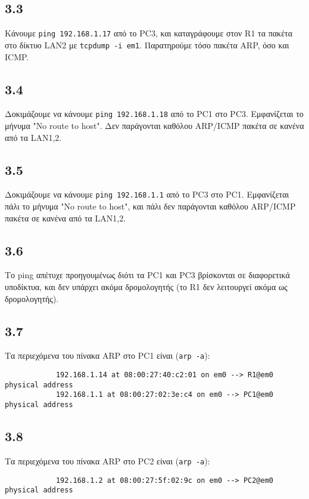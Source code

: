 \documentclass[a4paper, 12pt]{article}
\begin{document}
	\subsection*{3.3}
		Κάνουμε \verb|ping 192.168.1.17| από το PC3, και καταγράφουμε στον R1 τα πακέτα στο δίκτυο LAN2 με \verb|tcpdump -i em1|. Παρατηρούμε τόσο πακέτα ARP, όσο και ICMP.

	\subsection*{3.4}
		Δοκιμάζουμε να κάνουμε \verb|ping 192.168.1.18| από το PC1 στο PC3. Εμφανίζεται το μήνυμα "No route to host". Δεν παράγονται καθόλου ARP/ICMP πακέτα σε κανένα από τα LAN1,2.

	\subsection*{3.5}
		Δοκιμάζουμε να κάνουμε \verb|ping 192.168.1.1| από το PC3 στο PC1. Εμφανίζεται πάλι το μήνυμα "No route to host", και πάλι δεν παράγονται καθόλου ARP/ICMP πακέτα σε κανένα από τα LAN1,2.

	\subsection*{3.6}
		Το ping απέτυχε προηγουμένως διότι τα PC1 και PC3 βρίσκονται σε διαφορετικά υποδίκτυα, και δεν υπάρχει ακόμα δρομολογητής (το R1 δεν λειτουργεί ακόμα ως δρομολογητής).

	\subsection*{3.7}
		Τα περιεχόμενα του πίνακα ARP στο PC1 είναι (\verb|arp -a|): 
		
		\begin{verbatim}
			192.168.1.14 at 08:00:27:40:c2:01 on em0 --> R1@em0 physical address
			192.168.1.1 at 08:00:27:02:3e:c4 on em0 --> PC1@em0 physical address
		\end{verbatim}

	\subsection*{3.8}
		Τα περιεχόμενα του πίνακα ARP στο PC2 είναι (\verb|arp -a|): 
		
		\begin{verbatim}
			192.168.1.2 at 08:00:27:5f:02:9c on em0 --> PC2@em0 physical address
		\end{verbatim}
		
\end{document}
